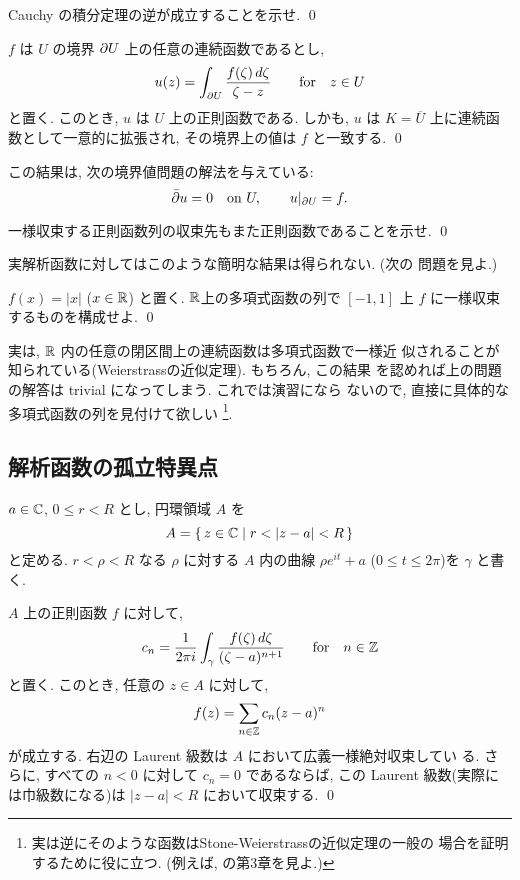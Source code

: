 \documentclass[12pt,twoside]{jarticle}
\begin{document}
\begin{question}
  Cauchy の積分定理の逆が成立することを示せ. \qed
\end{question}


\begin{question}
  $f$ は $U$ の境界 $\partial U$ 上の任意の連続函数であるとし, 
  \[
    u(z) = \int_{\partial U} \frac{f(\zeta)\,d\zeta}{\zeta - z}
    \qquad
    \text{for}\quad z\in U
  \]%
  と置く. このとき, $u$ は $U$ 上の正則函数である. %
  しかも, $u$ は $K = \overline{U}$ 上に連続函数として一意的に拡張され, 
  その境界上の値は $f$ と一致する. \qed
\end{question}

\noindent この結果は, 次の境界値問題の解法を与えている:
\[
  {\bar\partial} u = 0 \quad\text{on}\ U,
  \qquad
  u|_{\partial U} = f.
\]


\begin{question}
  一様収束する正則函数列の収束先もまた正則函数であることを示せ. \qed
\end{question}

\noindent 実解析函数に対してはこのような簡明な結果は得られない. (次の
問題を見よ.)

\begin{question}
  $f(x)=|x|$ ($x\in{\mathbb R}$) と置く. ${\mathbb R}$上の多項式函数の列で $[-1,1]$ 上 
  $f$ に一様収束するものを構成せよ. \qed
\end{question}

\noindent 実は, ${\mathbb R}$ 内の任意の閉区間上の連続函数は多項式函数で一様近
似されることが知られている(Weierstrassの近似定理). もちろん, この結果
を認めれば上の問題の解答は trivial になってしまう. これでは演習になら
ないので, 直接に具体的な多項式函数の列を見付けて欲しい%
\footnote{実は逆にそのような函数はStone-Weierstrassの近似定理の一般の
  場合を証明するために役に立つ. (例えば, \cite{Lang}の第3章を見よ.)}.



\subsection{解析函数の孤立特異点}


$a\in{\mathbb C}$, $0\le r<R$ とし, 円環領域 $A$ を
\[%
    A = \{\, z\in\C \mid r < |z - a| < R \,\}
\]%
と定める. $r<\rho<R$ なる $\rho$ に対する %
$A$ 内の曲線 $\rho e^{it}+a$ ($0\le t \le 2\pi$)を $\gamma$ と書く.

\begin{question}[Laurent 展開]
  $A$ 上の正則函数 $f$ に対して, 
  \[
    c_n =
    \frac{1}{2\pi i}
    \int_{\gamma} \frac{f(\zeta)\,d\zeta}{(\zeta - a)^{n+1}}
    \qquad
    \text{for}\quad n\in{\mathbb Z}
  \]%
  と置く. このとき, 任意の $z\in A$ に対して, 
  \[
    f(z) = \sum_{n\in{\mathbb Z}} c_n (z - a)^n
  \]%
  が成立する. 右辺の Laurent 級数は $A$ において広義一様絶対収束してい
  る. さらに, すべての $n<0$ に対して $c_n = 0$ であるならば, この 
  Laurent 級数(実際には巾級数になる)は $|z-a|<R$ において収束する. 
  \qed
\end{question}
\end{document}
